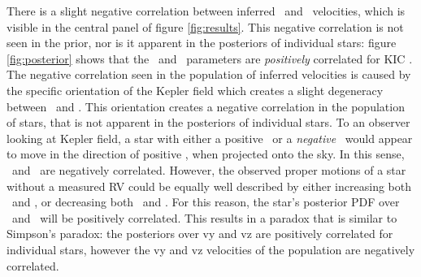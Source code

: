 There is a slight negative correlation between inferred \vy\ and \vz\
velocities, which is visible in the central panel of figure \ref{fig:results}.
This negative correlation is not seen in the prior, nor is it apparent in the
posteriors of individual stars: figure \ref{fig:posterior} shows that the \vy\
and \vz\ parameters are {\it positively} correlated for KIC \kicstar.
The negative correlation seen in the population of inferred velocities is
caused by the specific orientation of the Kepler field which creates a slight
degeneracy between \vy\ and \vz.
This orientation creates a negative correlation in the population of stars,
that is not apparent in the posteriors of individual stars.
To an observer looking at Kepler field, a star with either a positive \vz\ or
a {\it negative} \vy\ would appear to move in the direction of positive \vz,
when projected onto the sky.
In this sense, \vy\ and \vz\ are negatively correlated.
However, the observed proper motions of a star without a measured RV could be
equally well described by either increasing both \vy\ and \vz, or decreasing
both \vy\ and \vz.
For this reason, the star's posterior PDF over \vy\ and \vz\ will be
positively correlated.
This results in a paradox that is similar to Simpson's paradox: the posteriors
over vy and vz are positively correlated for individual stars, however the vy
and vz velocities of the population are negatively correlated.


